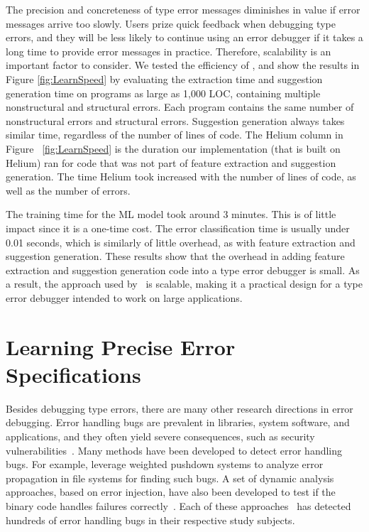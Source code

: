 \documentclass[12pt]{report}	%
\begin{document}
The precision and concreteness
of type error messages diminishes
in value if error messages
arrive too slowly. Users prize
quick feedback when debugging type errors,
and they will be less likely to continue using
an error debugger if it takes a long time
to provide error messages in practice.
Therefore, scalability is an important factor to consider. 
We tested the efficiency of \newCompiler,
and show the results in Figure \ref{fig:LearnSpeed} by evaluating
the extraction time and suggestion generation time on
programs as large as 1,000 LOC, containing multiple nonstructural
and structural errors. Each program contains the same number
of nonstructural errors and structural errors. 
%
Suggestion generation always takes
similar time, regardless of the number of lines of code.
%
The Helium column in Figure ~\ref{fig:LearnSpeed} is the duration
our implementation (that is built on
%
Helium) ran for code that was not part of feature extraction and suggestion
generation. 
%
The
time Helium took increased with the number of lines of code,
as well as the number of errors.

The training time for
the ML model took around 3
minutes. This is of little
impact since it is a one-time cost.
The error classification time
is usually under 0.01 seconds, 
which is similarly of
little overhead, as with
feature extraction and
suggestion generation.
These results show that the
overhead in adding feature extraction and suggestion generation code into
a type error debugger is small. 
As a result, the approach used by \newCompiler\
is scalable, making it a practical design for
a type error debugger intended to work on large applications.

\chapter{Learning Precise Error Specifications}
\label{sec:app}


Besides debugging type errors, there are many other research directions in error debugging.
%
Error handling bugs are prevalent in libraries, system software, and
applications, and they often yield severe consequences, such as
security vulnerabilities~\cite{OWASP2007}.
%
Many methods have been developed to detect
error handling bugs. 
%
For example, \cite{Rubio-Gonzalez:2009:EPA:1542476.1542506} leverage weighted pushdown systems to analyze error propagation in file systems
for finding such bugs.
A set of dynamic analysis approaches, based on error injection, have also been developed 
to test if the binary code handles
failures correctly~\cite{marinescu2011efficient,susskraut2006automatically,gunawi2008eio}.
%
Each of these approaches~\cite{jana2016automatically,Rubio-Gonzalez:2009:EPA:1542476.1542506,gunawi2008eio} 
has detected hundreds of error handling bugs in their respective study subjects.
\end{document}
